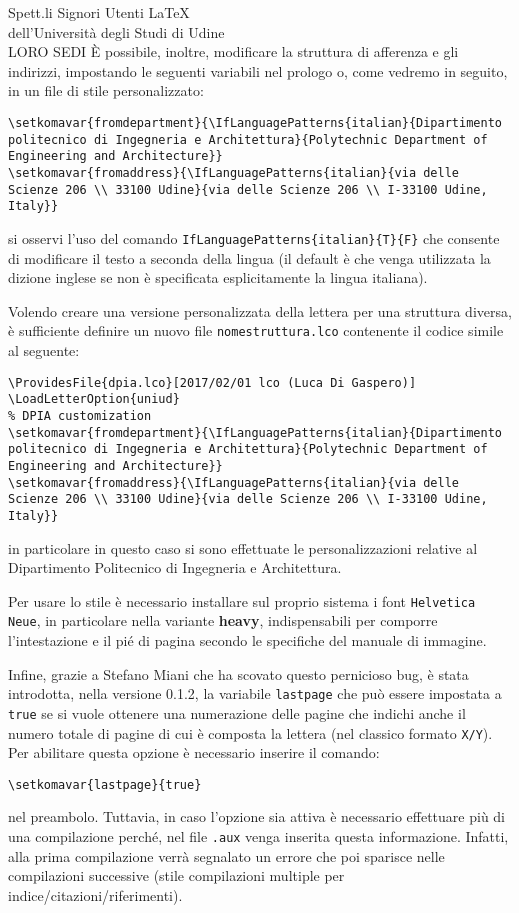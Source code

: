 \documentclass[dpia,subject=true]{scrlttr2}
\begin{document}
\begin{letter}{Spett.li Signori Utenti \LaTeX \\
    dell'Università degli Studi di Udine \\
    \MakeUppercase{Loro Sedi}
    }
    È possibile, inoltre, modificare la struttura di afferenza e gli indirizzi, impostando le seguenti variabili nel prologo o, come vedremo in seguito, in un file di stile personalizzato:
\begin{lstlisting}
\setkomavar{fromdepartment}{\IfLanguagePatterns{italian}{Dipartimento politecnico di Ingegneria e Architettura}{Polytechnic Department of Engineering and Architecture}}
\setkomavar{fromaddress}{\IfLanguagePatterns{italian}{via delle Scienze 206 \\ 33100 Udine}{via delle Scienze 206 \\ I-33100 Udine, Italy}}
\end{lstlisting}
  si osservi l'uso del comando \lstinline|IfLanguagePatterns{italian}{T}{F}| che consente di modificare il testo a seconda della lingua (il default è che venga utilizzata la dizione inglese se non è specificata esplicitamente la lingua italiana).
  
  Volendo creare una versione personalizzata della lettera per una struttura diversa, è sufficiente definire un nuovo file \texttt{nomestruttura.lco} contenente il codice simile al seguente:
\begin{lstlisting}
\ProvidesFile{dpia.lco}[2017/02/01 lco (Luca Di Gaspero)]
\LoadLetterOption{uniud}
% DPIA customization
\setkomavar{fromdepartment}{\IfLanguagePatterns{italian}{Dipartimento politecnico di Ingegneria e Architettura}{Polytechnic Department of Engineering and Architecture}}
\setkomavar{fromaddress}{\IfLanguagePatterns{italian}{via delle Scienze 206 \\ 33100 Udine}{via delle Scienze 206 \\ I-33100 Udine, Italy}}
\end{lstlisting}
   in particolare in questo caso si sono effettuate le personalizzazioni relative al Dipartimento Politecnico di Ingegneria e Architettura.
  
    Per usare lo stile è necessario installare sul proprio sistema i font \texttt{Helvetica Neue},  in particolare nella variante \textbf{heavy}, indispensabili per comporre l'intestazione e il pié di pagina secondo le specifiche del manuale di immagine.
    
    Infine, grazie a Stefano Miani che ha scovato questo pernicioso bug, è stata introdotta, nella versione 0.1.2, la variabile \texttt{lastpage} che può essere impostata a \lstinline{true} se si vuole ottenere una numerazione delle pagine che indichi anche il numero totale di pagine di cui è composta la lettera (nel classico formato \texttt{X/Y}). Per abilitare questa opzione è necessario inserire il comando:
\begin{lstlisting}
\setkomavar{lastpage}{true}
\end{lstlisting}
  nel preambolo. Tuttavia, in caso l'opzione sia attiva è necessario effettuare più di una compilazione perché, nel file \texttt{.aux} venga inserita questa informazione. Infatti, alla prima compilazione verrà segnalato un errore che poi sparisce nelle compilazioni successive (stile compilazioni multiple per indice/citazioni/riferimenti).
    

\end{letter}
\end{document}
